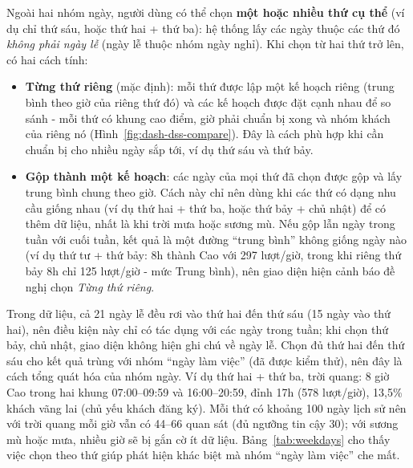 \noindent Ngoài hai nhóm ngày, người dùng có thể chọn \textbf{một hoặc nhiều thứ cụ thể} (ví dụ chỉ thứ sáu, hoặc thứ hai + thứ ba): hệ thống lấy các ngày thuộc các thứ đó \textit{không phải ngày lễ} (ngày lễ thuộc nhóm ngày nghỉ). Khi chọn từ hai thứ trở lên, có hai cách tính:
\begin{itemize}
    \item \textbf{Từng thứ riêng} (mặc định): mỗi thứ được lập một kế hoạch riêng (trung bình theo giờ của riêng thứ đó) và các kế hoạch được đặt cạnh nhau để so sánh - mỗi thứ có khung cao điểm, giờ phải chuẩn bị xong và nhóm khách của riêng nó (Hình~\ref{fig:dash-dss-compare}). Đây là cách phù hợp khi cần chuẩn bị cho nhiều ngày sắp tới, ví dụ thứ sáu và thứ bảy.
    \item \textbf{Gộp thành một kế hoạch}: các ngày của mọi thứ đã chọn được gộp và lấy trung bình chung theo giờ. Cách này chỉ nên dùng khi các thứ có dạng nhu cầu giống nhau (ví dụ thứ hai + thứ ba, hoặc thứ bảy + chủ nhật) để có thêm dữ liệu, nhất là khi trời mưa hoặc sương mù. Nếu gộp lẫn ngày trong tuần với cuối tuần, kết quả là một đường ``trung bình'' không giống ngày nào (ví dụ thứ tư + thứ bảy: 8h thành Cao với 297 lượt/giờ, trong khi riêng thứ bảy 8h chỉ 125 lượt/giờ - mức Trung bình), nên giao diện hiện cảnh báo đề nghị chọn \textit{Từng thứ riêng}.
\end{itemize}
Trong dữ liệu, cả 21 ngày lễ đều rơi vào thứ hai đến thứ sáu (15 ngày vào thứ hai), nên điều kiện này chỉ có tác dụng với các ngày trong tuần; khi chọn thứ bảy, chủ nhật, giao diện không hiện ghi chú về ngày lễ. Chọn đủ thứ hai đến thứ sáu cho kết quả trùng với nhóm ``ngày làm việc'' (đã được kiểm thử), nên đây là cách tổng quát hóa của nhóm ngày. Ví dụ thứ hai + thứ ba, trời quang: 8 giờ Cao trong hai khung 07:00--09:59 và 16:00--20:59, đỉnh 17h (578 lượt/giờ), 13,5\% khách vãng lai (chủ yếu khách đăng ký). Mỗi thứ có khoảng 100 ngày lịch sử nên với trời quang mỗi giờ vẫn có 44--66 quan sát (đủ ngưỡng tin cậy 30); với sương mù hoặc mưa, nhiều giờ sẽ bị gắn cờ ít dữ liệu. Bảng~\ref{tab:weekdays} cho thấy việc chọn theo thứ giúp phát hiện khác biệt mà nhóm ``ngày làm việc'' che mất.

